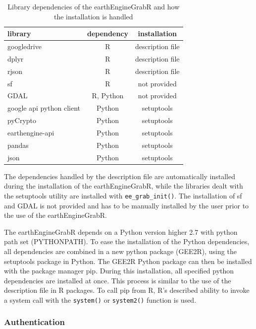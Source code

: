 \begin{table}[h]
	\begin{tabularx}{\textwidth}{|X|C|C|}
		\hline
		\textbf{library} & \textbf{dependency} & \textbf{installation}  \\
		\hline
		googledrive & R  & description file  \\
		dplyr & R  & description file  \\
		rjson & R  & description file  \\
		sf & R  & not provided  \\
		GDAL & R, Python  & not provided  \\
		google api python client & Python  & setuptools  \\
		pyCrypto & Python  & setuptools  \\
		earthengine-api & Python  & setuptools  \\        
		pandas & Python  & setuptools  \\        
		json & Python  & setuptools  \\        
		\hline
	\end{tabularx}
	\caption{Library dependencies of the earthEngineGrabR and how the installation is handled}
	\label{dependencies}
\end{table}

The dependencies handled by the description file are automatically installed during the installation of the earthEngineGrabR, while the libraries dealt with the setuptools utility are installed with \texttt{ee\_grab\_init()}. The installation of sf and GDAL is not provided and has to be manually installed by the user prior to the use of the earthEngineGrabR.

The earthEngineGrabR depends on a Python version higher 2.7 with python path set (PYTHONPATH). To ease the installation of the Python dependencies, all dependencies are combined in a new python package (GEE2R), using the setuptools package in Python. The GEE2R Python package can then be installed with the package manager pip. During this installation, all specified python dependencies are installed at once. This process is similar to the use of the description file in R packages. To call pip from R, R's described ability to invoke a system call with the \texttt{system()} or \texttt{system2()} function is used.

\subsubsection{Authentication}

